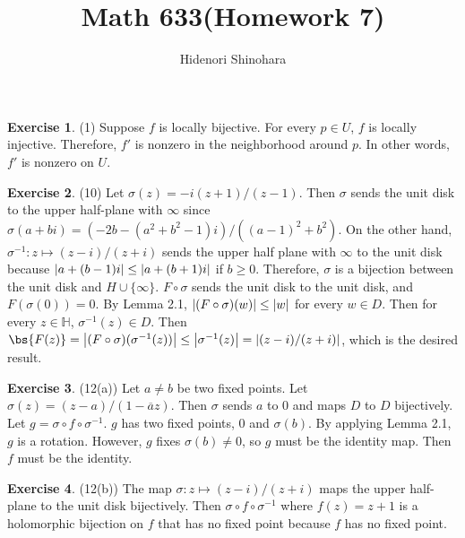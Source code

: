 \documentclass[12pt, psamsfonts]{amsart}
\theoremstyle{definition}
\newtheorem*{exer}{Exercise}
\theoremstyle{remark}
\numberwithin{equation}{section}
\begin{document}
\title{Math 633(Homework 7)}
\author{Hidenori Shinohara}
\maketitle

\begin{exer}{(1)}
  Suppose $f$ is locally bijective.
  For every $p \in U$, $f$ is locally injective.
  Therefore, $f'$ is nonzero in the neighborhood around $p$.
  In other words, $f'$ is nonzero on $U$.

\end{exer}

\begin{exer}{(10)}
  Let $\sigma(z) = -i(z + 1) / (z - 1)$.
  Then $\sigma$ sends the unit disk to the upper half-plane with $\infty$ since
  $\sigma(a + bi) = (-2b - (a^2 + b^2 - 1)i) / ((a - 1)^2 + b^2)$.
  On the other hand, $\sigma^{-1}: z \mapsto (z - i) / (z + i)$ sends the upper half plane with $\infty$ to the unit disk because $\abs{a + (b - 1)i} \leq \abs{a + (b + 1)i}$ if $b \geq 0$.
  Therefore, $\sigma$ is a bijection between the unit disk and $H \cup \{ \infty \}$.
  $F \circ \sigma$ sends the unit disk to the unit disk, and $F(\sigma(0)) = 0$.
  By Lemma 2.1, $\abs{(F \circ \sigma)(w)} \leq \abs{w}$ for every $w \in D$.
  Then for every $z \in \mathbb{H}$, $\sigma^{-1}(z) \in D$.
  Then $\bs{F(z)} = \abs{(F \circ \sigma)(\sigma^{-1}(z))} \leq \abs{\sigma^{-1}(z)} = \abs{(z - i) / (z + i)}$, which is the desired result.
\end{exer}

\begin{exer}{(12(a))}
  Let $a \ne b$ be two fixed points.
  Let $\sigma(z) = (z - a) / (1 - \overline{a}z)$.
  Then $\sigma$ sends $a$ to $0$ and maps $D$ to $D$ bijectively.
  Let $g = \sigma \circ f \circ \sigma^{-1}$.
  $g$ has two fixed points, 0 and $\sigma(b)$.
  By applying Lemma 2.1, $g$ is a rotation.
  However, $g$ fixes $\sigma(b) \ne 0$, so $g$ must be the identity map.
  Then $f$ must be the identity.
\end{exer}

\begin{exer}{(12(b))}
  The map $\sigma: z \mapsto (z - i) / (z + i)$ maps the upper half-plane to the unit disk bijectively.
  Then $\sigma \circ f \circ \sigma^{-1}$ where $f(z) = z + 1$ is a holomorphic bijection on $f$ that has no fixed point because $f$ has no fixed point.
\end{exer}
\end{document}

